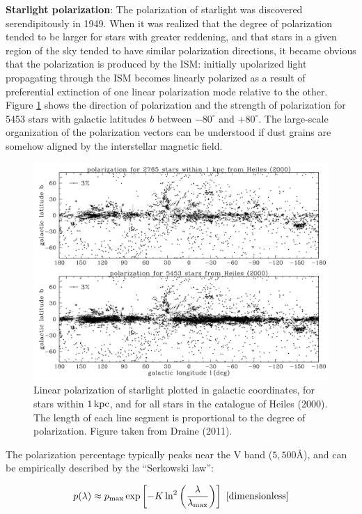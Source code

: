 \documentclass[a4paper,10pt]{article}
\begin{document}
{\noindent}\textbf{Starlight polarization}: The polarization of starlight was discovered serendipitously in 1949. When it was realized that the degree of polarization tended to be larger for stars with greater reddening, and that stars in a given region of the sky tended to have similar polarization directions, it became obvious that the polarization is produced by the ISM: initially upolarized light propagating through the ISM becomes linearly polarized as a result of preferential extinction of one linear polarization mode relative to the other. Figure \ref{fig:starpol} shows the direction of polarization and the strength of polarization for 5453 stars with galactic latitudes $b$ between $-80^\circ$ and $+80^\circ$. The large-scale organization of the polarization vectors can be understood if dust grains are somehow aligned by the interstellar magnetic field. 

\begin{figure}[t]
    \centering
    \includegraphics[width=14cm]{figures/starpol.png}
    \caption{\footnotesize{Linear polarization of starlight plotted in galactic coordinates, for stars within $1\,{\rm kpc}$, and for all stars in the catalogue of Heiles (2000). The length of each line segment is proportional to the degree of polarization. Figure taken from Draine (2011).}}
    \label{fig:starpol}
\end{figure}

{\noindent}The polarization percentage typically peaks near the V band ($5,500$\AA), and can be empirically described by the ``Serkowski law'':

\begin{align*}
    p(\lambda) \approx p_\mathrm{max}\exp \left[-K\ln^2\left(\frac{\lambda}{\lambda_\mathrm{max}}\right)\right] ~ [{\rm dimensionless}]
\end{align*}
\end{document}
